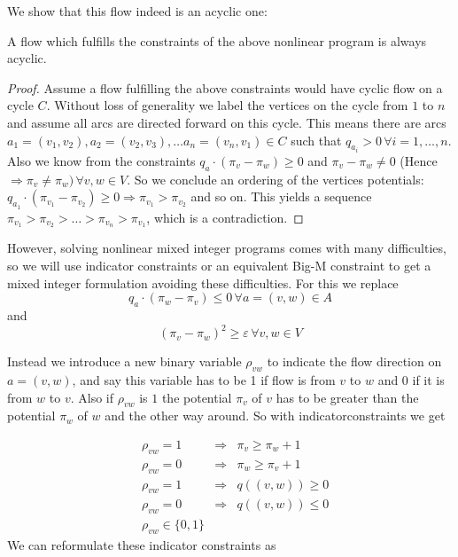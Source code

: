 We show that this flow indeed is an acyclic one:

\begin{prop}
 A flow which fulfills the constraints of the above nonlinear program is always acyclic.
\end{prop}
\begin{proof}
 Assume a flow fulfilling the above constraints would have cyclic flow on a cycle $C$. Without loss of generality 
we label the vertices on the cycle from $1$ to $n$ and assume all arcs are directed forward on this cycle. This means 
there are arcs $a_1=(v_1,v_2),a_2=(v_2,v_3), \dots a_n=(v_n, v_1)\in C$ such that $q_{a_i} > 0 \,\forall i={1,\dots , 
n}$. Also we know from the constraints  $q_a\cdot (\pi_v -\pi_w)\ge 0$ and $\pi_v - \pi_w \neq 0$ (Hence $\Rightarrow 
\pi_v\neq\pi_w)\, \forall v,w\in V$. So we conclude an ordering of the vertices potentials: $q_{a_1}\cdot (\pi_{v_1} 
-\pi_{v_2})\ge 0 \Rightarrow \pi_{v_1}>\pi_{v_2}$ and so on. This yields a sequence $\pi_{v_1}>\pi_{v_2}>\dots 
>\pi_{v_n}>\pi_{v_1}$, which is a contradiction. \Lightning
\end{proof}

However, solving nonlinear mixed integer programs comes with many difficulties, so we will use indicator constraints 
or an equivalent Big-M constraint to get a mixed integer formulation avoiding these difficulties. For this we  replace 
$$q_a\cdot (\pi_w -\pi_v)\le 0 \,\forall a=(v,w)\in A $$ and $$(\pi_v - \pi_w)^2 \ge \varepsilon \,\forall v,w \in V$$

Instead we introduce a new binary variable $\rho_{vw}$ to indicate the flow direction on $a=(v,w)$, and say this 
variable has to be 1 if flow is from $v$ to $w$ and 0 if it is from $w$ to $v$. Also if $\rho_{vw}$ is $1$ the 
potential $\pi_v$ of $v$ has to be greater than the potential $\pi_w$ of $w$ and the other way around. So with 
indicatorconstraints we get 

\begin{align*}
 &\rho_{vw}=1 &\Rightarrow &\pi_v\ge\pi_w +1\\
 &\rho_{vw}=0 &\Rightarrow &\pi_w\ge\pi_v +1\\
 &\rho_{vw}=1 &\Rightarrow &q((v,w))\ge 0\\
 &\rho_{vw}=0 &\Rightarrow &q((v,w))\le 0\\
 &\rho_{vw} \in \{0,1\}&&
\end{align*}
We can reformulate these indicator constraints as

